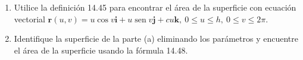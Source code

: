 \item 
    \begin{enumerate}
        \item[(a)] Utilice la definición 14.45 para encontrar el área de la superficie con ecuación vectorial $\mathbf{r}(u, v) = u \cos v\mathbf{i} + u \operatorname{sen} v\mathbf{j} + c u\mathbf{k}, \ 0 \le u \le h, \ 0 \le v \le 2\pi$.
        \item[(b)] Identifique la superficie de la parte (a) eliminando los parámetros y encuentre el área de la superficie usando la fórmula 14.48.
    \end{enumerate}
